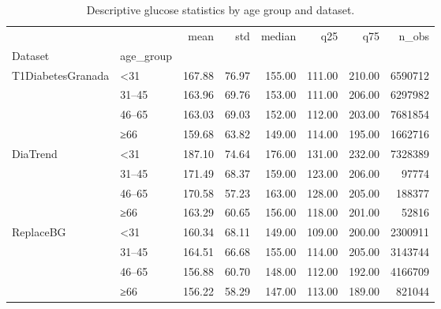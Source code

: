 \begin{table}
\caption{Descriptive glucose statistics by age group and dataset.}
\label{tab:glucose_stats_age}
\begin{tabular}{llrrrrrr}
\toprule
 &  & mean & std & median & q25 & q75 & n\_obs \\
Dataset & age_group &  &  &  &  &  &  \\
\midrule
\multirow[t]{4}{*}{T1DiabetesGranada} & <31 & 167.88 & 76.97 & 155.00 & 111.00 & 210.00 & 6590712 \\
 & 31–45 & 163.96 & 69.76 & 153.00 & 111.00 & 206.00 & 6297982 \\
 & 46–65 & 163.03 & 69.03 & 152.00 & 112.00 & 203.00 & 7681854 \\
 & ≥66 & 159.68 & 63.82 & 149.00 & 114.00 & 195.00 & 1662716 \\
\cline{1-8}
\multirow[t]{4}{*}{DiaTrend} & <31 & 187.10 & 74.64 & 176.00 & 131.00 & 232.00 & 7328389 \\
 & 31–45 & 171.49 & 68.37 & 159.00 & 123.00 & 206.00 & 97774 \\
 & 46–65 & 170.58 & 57.23 & 163.00 & 128.00 & 205.00 & 188377 \\
 & ≥66 & 163.29 & 60.65 & 156.00 & 118.00 & 201.00 & 52816 \\
\cline{1-8}
\multirow[t]{4}{*}{ReplaceBG} & <31 & 160.34 & 68.11 & 149.00 & 109.00 & 200.00 & 2300911 \\
 & 31–45 & 164.51 & 66.68 & 155.00 & 114.00 & 205.00 & 3143744 \\
 & 46–65 & 156.88 & 60.70 & 148.00 & 112.00 & 192.00 & 4166709 \\
 & ≥66 & 156.22 & 58.29 & 147.00 & 113.00 & 189.00 & 821044 \\
\cline{1-8}
\bottomrule
\end{tabular}
\end{table}
